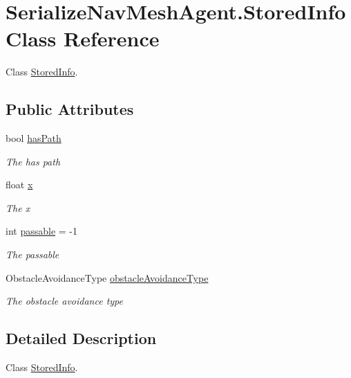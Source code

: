 \hypertarget{class_serialize_nav_mesh_agent_1_1_stored_info}{}\section{Serialize\+Nav\+Mesh\+Agent.\+Stored\+Info Class Reference}
\label{class_serialize_nav_mesh_agent_1_1_stored_info}


Class \hyperlink{class_serialize_nav_mesh_agent_1_1_stored_info}{Stored\+Info}.  


\subsection*{Public Attributes}
\begin{DoxyCompactItemize}
\item 
bool \hyperlink{class_serialize_nav_mesh_agent_1_1_stored_info_a22c390e4d774cb85933c1bc191c469ca}{has\+Path}
\begin{DoxyCompactList}\small\item\em The has path \end{DoxyCompactList}\item 
float \hyperlink{class_serialize_nav_mesh_agent_1_1_stored_info_a67ba07515a06b4bf79e95c9b312a49cc}{x}
\begin{DoxyCompactList}\small\item\em The x \end{DoxyCompactList}\item 
int \hyperlink{class_serialize_nav_mesh_agent_1_1_stored_info_ae37352696e63a839067ea3ad8654b38b}{passable} = -\/1
\begin{DoxyCompactList}\small\item\em The passable \end{DoxyCompactList}\item 
Obstacle\+Avoidance\+Type \hyperlink{class_serialize_nav_mesh_agent_1_1_stored_info_a5b52f98b4989bb553bc8d47677d75072}{obstacle\+Avoidance\+Type}
\begin{DoxyCompactList}\small\item\em The obstacle avoidance type \end{DoxyCompactList}\end{DoxyCompactItemize}


\subsection{Detailed Description}
Class \hyperlink{class_serialize_nav_mesh_agent_1_1_stored_info}{Stored\+Info}. 



